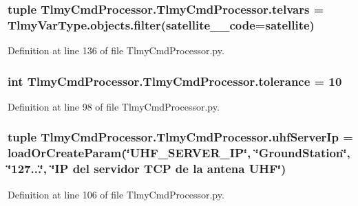 \subsubsection[{telvars}]{\setlength{\rightskip}{0pt plus 5cm}tuple Tlmy\+Cmd\+Processor.\+Tlmy\+Cmd\+Processor.\+telvars = Tlmy\+Var\+Type.\+objects.\+filter(satellite\+\_\+\+\_\+code={\bf satellite})}\label{namespace_tlmy_cmd_processor_1_1_tlmy_cmd_processor_a9d8c45d2e203eaa7eb7be5ece0116d39}


Definition at line 136 of file Tlmy\+Cmd\+Processor.\+py.

\hypertarget{namespace_tlmy_cmd_processor_1_1_tlmy_cmd_processor_afb50f24734d74f88dacebcac995fd9f4}{}
\subsubsection[{tolerance}]{\setlength{\rightskip}{0pt plus 5cm}int Tlmy\+Cmd\+Processor.\+Tlmy\+Cmd\+Processor.\+tolerance = 10}\label{namespace_tlmy_cmd_processor_1_1_tlmy_cmd_processor_afb50f24734d74f88dacebcac995fd9f4}


Definition at line 98 of file Tlmy\+Cmd\+Processor.\+py.

\hypertarget{namespace_tlmy_cmd_processor_1_1_tlmy_cmd_processor_ad1afaadb14f89dfd6adce55457a89fa4}{}
\subsubsection[{uhf\+Server\+Ip}]{\setlength{\rightskip}{0pt plus 5cm}tuple Tlmy\+Cmd\+Processor.\+Tlmy\+Cmd\+Processor.\+uhf\+Server\+Ip = load\+Or\+Create\+Param(\char`\"{}U\+H\+F\+\_\+\+S\+E\+R\+V\+E\+R\+\_\+\+I\+P\char`\"{}, \char`\"{}Ground\+Station\char`\"{}, \char`\"{}127...\char`\"{}, \char`\"{}I\+P del servidor T\+C\+P de la antena U\+H\+F\char`\"{})}\label{namespace_tlmy_cmd_processor_1_1_tlmy_cmd_processor_ad1afaadb14f89dfd6adce55457a89fa4}


Definition at line 106 of file Tlmy\+Cmd\+Processor.\+py.

